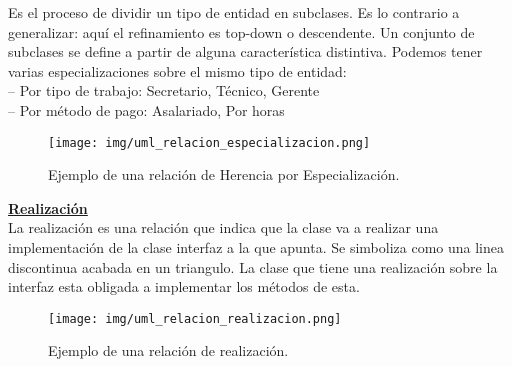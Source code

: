 \documentclass[10pt,a4paper,titlepage]{article}
\begin{document}
Es el proceso de dividir un tipo de entidad en subclases. Es lo contrario a generalizar: aquí el refinamiento es top-down o descendente. Un conjunto de subclases se define a partir de alguna característica distintiva. Podemos tener varias especializaciones sobre el mismo tipo de entidad:\\
– Por tipo de trabajo: Secretario, Técnico, Gerente\\
– Por método de pago: Asalariado, Por horas

\begin{figure}[H] %
\centering
\texttt{[image: img/uml\_relacion\_especializacion.png]}
\caption{Ejemplo de una relación de Herencia por Especialización.} \label{fig:uml_rel_especializacion}
\end{figure}


\underline{\textbf{Realización}}\\
La realización es una relación que indica que la clase va a realizar una implementación de la clase interfaz a la que apunta. Se simboliza como una linea discontinua acabada en un triangulo. La clase que tiene una realización sobre la interfaz esta obligada a implementar los métodos de esta.
\begin{figure}[H] %
\centering
\texttt{[image: img/uml\_relacion\_realizacion.png]}
\caption{Ejemplo de una relación de realización.} \label{fig:uml_rel_realizacion}
\end{figure}
\end{document}
